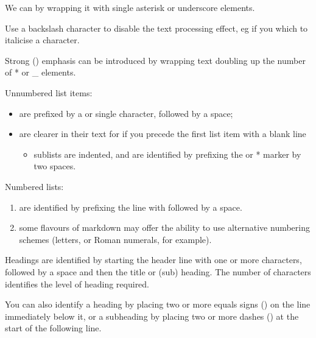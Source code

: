 \documentclass[letterpaper,10pt,english]{sphinxmanual}
\begin{document}
We can  by wrapping it with single asterisk  or  underscore elements.

Use a backslash character to disable the text processing effect, eg if you which to italicise a \sphinxstyleemphasis{*} character.

Strong () emphasis can be introduced by wrapping text doubling up the number of * or \_ elements.

Unnumbered list items:
\begin{itemize}
\item {} 
are prefixed by a \sphinxcode{\sphinxupquote{\sphinxhyphen{}}} or single \sphinxcode{\sphinxupquote{*}} character, followed by a space;

\item {} 
are clearer in their text for if you precede the first list item with a blank line
\begin{itemize}
\item {} 
sublists are indented, and are identified by prefixing the \sphinxhyphen{} or * marker by two spaces.

\end{itemize}

\end{itemize}

Numbered lists:
\begin{enumerate}
%
\item {} 
are identified by prefixing the line with  followed by a space.

\item {} 
some flavours of markdown may offer the ability to use alternative numbering schemes (letters, or Roman numerals, for example).

\end{enumerate}

Headings are identified by starting the header line with one or more \sphinxcode{\sphinxupquote{\#}} characters, followed by a space and then the title or (sub) heading. The number of \sphinxcode{\sphinxupquote{\#}} characters identifies the level of heading required.

You can also identify a heading by placing two or more equals signs (\sphinxcode{\sphinxupquote{==}}) on the line immediately below it, or a subheading by placing two or more dashes (\sphinxcode{\sphinxupquote{\sphinxhyphen{}\sphinxhyphen{}}}) at the start of the following line.
\end{document}
